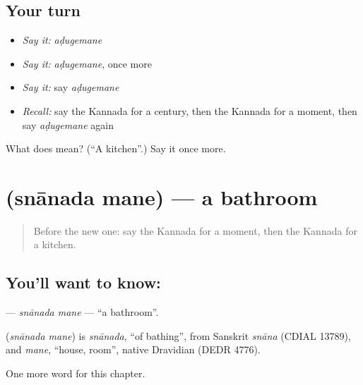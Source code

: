 \subsection*{Your turn}
\begin{itemize}
\raggedright
  \item \emph{Say it:} \emph{aḍugemane}
  \item \emph{Say it:} \emph{aḍugemane}, once more
  \item \emph{Say it:} say \emph{aḍugemane}
  \item \emph{Recall:} say the Kannada for a century, then the Kannada for a moment, then say \emph{aḍugemane} again
\end{itemize}

\begin{tcolorbox}[breakable,colback=teal!4,colframe=teal!35!black,title={Before you move on}]
What does  mean? (\textquotedblleft{}A kitchen\textquotedblright{}.) Say it once more.
\end{tcolorbox}
\section[\texorpdfstring{\kn{ಸ್ನಾನದ} \kn{ಮನೆ} (snānada mane)}{ಸ್ನಾನದ ಮನೆ (snānada mane)}]{  (snānada mane) — a bathroom}

\label{lesson:KA-C173-snanada-mane}



\begin{quote}
Before the new one: say the Kannada for a moment, then the Kannada for a kitchen.
\end{quote}

\subsection*{You'll want to know:  }
\textbf{ } — \emph{snānada mane} — \textquotedblleft{}a bathroom\textquotedblright{}.

\begin{cousinweb}
\textbf{ } (\emph{snānada mane}) is \emph{snānada}, \textquotedblleft{}of bathing\textquotedblright{}, from Sanskrit \emph{snāna} (CDIAL 13789), and \emph{mane}, \textquotedblleft{}house, room\textquotedblright{}, native Dravidian (DEDR 4776).
\end{cousinweb}

\begin{grammarlens}[title={What you've built}]
One more word for this chapter.
\end{grammarlens}

